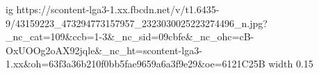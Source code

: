  
 
 
 
 

\par
\ifcmt
  ig https://scontent-lga3-1.xx.fbcdn.net/v/t1.6435-9/43159223_473294773157957_2323030025223274496_n.jpg?_nc_cat=109&ccb=1-3&_nc_sid=09cbfe&_nc_ohc=cB-OxUOOg2oAX92jqle&_nc_ht=scontent-lga3-1.xx&oh=63f3a36b210f0bb5fae9659a6a3f9e29&oe=6121C25B
  width 0.15
\fi
